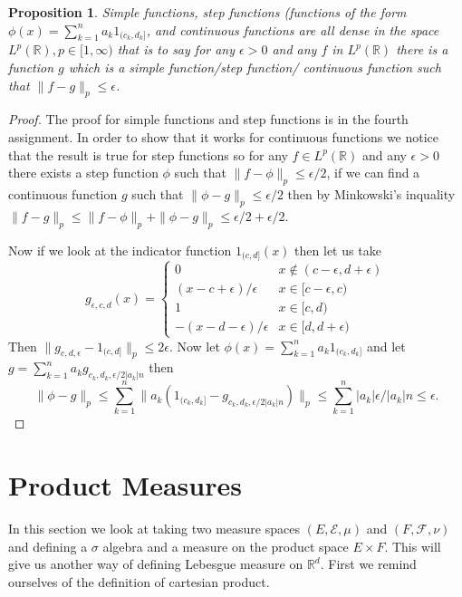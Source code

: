 \documentclass[11pt]{article}
\newtheorem{prp}[thm]{Proposition}
\theoremstyle{definition}
\theoremstyle{remark}
\begin{document}
\begin{prp}
Simple functions, step functions (functions of the form $\phi(x) = \sum_{k=1}^n a_k 1_{(c_k,d_k]}$, and continuous functions are all dense in the space $L^p(\mathbb{R}), p \in [1,\infty)$ that is to say for any $\epsilon > 0$ and any $f$ in $L^p(\mathbb{R})$ there is a function $g$ which is a simple function/step function/ continuous function such that $\|f-g\|_p \leq \epsilon$.
\end{prp}
\begin{proof}
The proof for simple functions and step functions is in the fourth assignment. In order to show that it works for continuous functions we notice that the result is true for step functions so for any $f \in L^p(\mathbb{R})$ and any $\epsilon >0$ there exists a step function $\phi$ such that $\| f-\phi\|_p \leq \epsilon/2$, if we can find a continuous function $g$ such that $\|\phi-g\|_p \leq \epsilon/2$ then by Minkowski's inquality $\|f-g\|_p \leq \|f-\phi\|_p + \|\phi - g\|_p \leq \epsilon/2 + \epsilon/2$.

Now if we look at the indicator function $1_{(c,d]}(x)$ then let us take \[g_{\epsilon, c,d}(x) = \left\{ \begin{array}{ll} 0 & x \notin (c-\epsilon, d+\epsilon) \\ (x-c+ \epsilon)/\epsilon & x \in [c-\epsilon, c) \\ 1 & x \in [c,d) \\ -(x-d -\epsilon)/\epsilon & x \in [d, d+\epsilon) \end{array} \right. \]
Then $\|g_{c,d,\epsilon}-1_{(c,d]}\|_p \leq 2\epsilon$. Now let $\phi(x) = \sum_{k=1}^n a_k 1_{(c_k,d_k]}$ and let $g = \sum_{k=1}^n a_k g_{c_k, d_k, \epsilon/2|a_k| n}$ then
\[\| \phi - g\|_p \leq \sum_{k=1}^n \| a_k (1_{(c_k, d_k]} - g_{c_k, d_k, \epsilon/2|a_k|n})\|_p \leq \sum_{k=1}^n |a_k| \epsilon/|a_k| n \leq \epsilon.  \]
\end{proof}



\section{Product Measures}

In this section we look at taking two measure spaces $(E, \mathcal{E}, \mu)$ and $(F, \mathcal{F}, \nu)$ and defining a $\sigma$ algebra and a measure on the product space $E \times F$. This will give us another way of defining Lebesgue measure on $\mathbb{R}^d$. First we remind ourselves of the definition of cartesian product.
\end{document}
